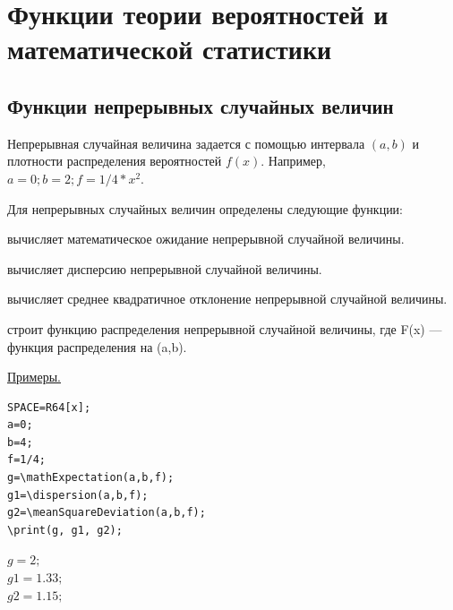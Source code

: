 \chapter{ Функции теории вероятностей и математической статистики}

\section{Функции непрерывных случайных величин}
Непрерывная случайная величина задается с помощью интервала $(a,b)$ и плотности распределения вероятностей $f(x)$.
Например,  $a=0; b=2; f=1/4*x^2.$ 

Для непрерывных случайных величин  определены следующие функции:

 вычисляет математическое ожидание непрерывной случайной величины.

 вычисляет дисперсию непрерывной случайной величины. 

 вычисляет среднее квадратичное отклонение непрерывной случайной величины.

 строит функцию распределения непрерывной случайной величины, 
где  F(x) --- функция распределения на (a,b).

\underline{Примеры.}

\vspace*{-2mm}
\begin{verbatim}
SPACE=R64[x]; 
a=0;
b=4;
f=1/4;
g=\mathExpectation(a,b,f); 
g1=\dispersion(a,b,f); 
g2=\meanSquareDeviation(a,b,f);  
\print(g, g1, g2);
\end{verbatim}

{$g = 2; $\\
\hspace*{4mm} $g1 = 1.33; $\\
\hspace*{4mm} $g2 = 1.15;$} 

